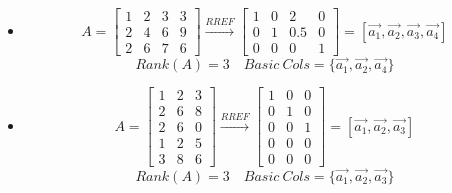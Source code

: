 \documentclass[9pt]{article}
\theoremstyle{plain}
\begin{document}
\begin{itemize}
	\item[(a)]
	      \[
		      A = \begin{bmatrix}
			      1 & 2 & 3 & 3 \\
			      2 & 4 & 6 & 9 \\
			      2 & 6 & 7 & 6
		      \end{bmatrix} \xrightarrow{RREF}
		      \begin{bmatrix}
			      1 & 0 & 2   & 0 \\
			      0 & 1 & 0.5 & 0 \\
			      0 & 0 & 0   & 1
		      \end{bmatrix} =
		      [
		      \vec{a_1},
		      \vec{a_2},
		      \vec{a_3},
		      \vec{a_4}
		      ]
	      \]
	      \[
		      Rank(A) = 3 \quad Basic ~Cols = \{ \vec{a_1}, \vec{a_2}, \vec{a_4}\}
	      \]

	\item[(b)]
	      \[
		      A = \begin{bmatrix}
			      1 & 2 & 3 \\
			      2 & 6 & 8 \\
			      2 & 6 & 0 \\
			      1 & 2 & 5 \\
			      3 & 8 & 6
		      \end{bmatrix} \xrightarrow{RREF}
		      \begin{bmatrix}
			      1 & 0 & 0 \\
			      0 & 1 & 0 \\
			      0 & 0 & 1 \\
			      0 & 0 & 0 \\
			      0 & 0 & 0
		      \end{bmatrix} =
		      [
		      \vec{a_1},
		      \vec{a_2},
		      \vec{a_3}
		      ]
	      \]
	      \[
		      Rank(A) = 3 \quad Basic ~Cols = \{ \vec{a_1}, \vec{a_2}, \vec{a_3} \}
	      \]
\end{itemize}
\end{document}
